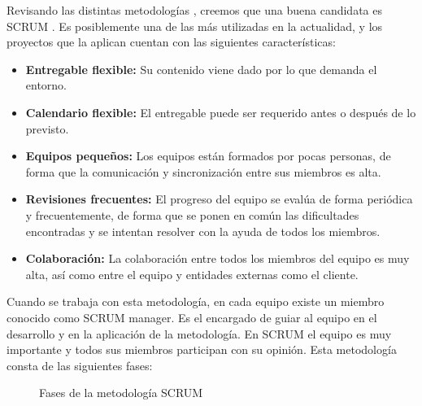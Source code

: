 Revisando las distintas metodologías \cite{despa2014comparative}, creemos que una buena candidata es SCRUM \cite{schwaber1997scrum}. Es posiblemente una de las más utilizadas en la actualidad, y los proyectos que la aplican cuentan con las siguientes características:

\begin{itemize}
    \item \textbf{Entregable flexible:} Su contenido viene dado por lo que demanda el entorno. 
    \item \textbf{Calendario flexible:} El entregable puede ser requerido antes o después de lo previsto.
    \item \textbf{Equipos pequeños:} Los equipos están formados por pocas personas, de forma que la comunicación y sincronización entre sus miembros es alta. 
    \item \textbf{Revisiones frecuentes:} El progreso del equipo se evalúa de forma periódica y frecuentemente, de forma que se ponen en común las dificultades encontradas y se intentan resolver con la ayuda de todos los miembros.
    \item \textbf{Colaboración:} La colaboración entre todos los miembros del equipo es muy alta, así como entre el equipo y entidades externas como el cliente.
\end{itemize}

Cuando se trabaja con esta metodología, en cada equipo existe un miembro conocido como SCRUM manager. Es el encargado de guiar al equipo en el desarrollo y en la aplicación de la metodología. En SCRUM el equipo es muy importante y todos sus miembros participan con su opinión. Esta metodología consta de las siguientes fases:


\begin{figure}[H]
\centering
    \caption{Fases de la metodología SCRUM \cite{schwaber1997scrum}} \label{fig:figura1}
\end{figure}

